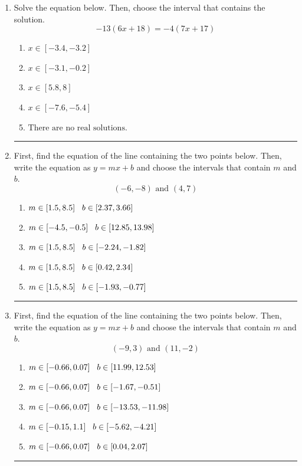 \documentclass[14pt]{extbook}
\newcommand{\litem}[1]{\item#1\hspace*{-1cm}\rule{\textwidth}{0.4pt}}
\begin{document}
\begin{enumerate}
\litem{
Solve the equation below. Then, choose the interval that contains the solution.\[ -13(6x + 18) = -4(7x + 17) \]\begin{enumerate}[label=\Alph*.]
\item \( x \in [-3.4, -3.2] \)
\item \( x \in [-3.1, -0.2] \)
\item \( x \in [5.8, 8] \)
\item \( x \in [-7.6, -5.4] \)
\item \( \text{There are no real solutions.} \)

\end{enumerate} }
\litem{
First, find the equation of the line containing the two points below. Then, write the equation as $ y=mx+b $ and choose the intervals that contain $m$ and $b$.\[ (-6, -8) \text{ and } (4, 7) \]\begin{enumerate}[label=\Alph*.]
\item \( m \in [1.5, 8.5] \hspace*{3mm} b \in [2.37, 3.66] \)
\item \( m \in [-4.5, -0.5] \hspace*{3mm} b \in [12.85, 13.98] \)
\item \( m \in [1.5, 8.5] \hspace*{3mm} b \in [-2.24, -1.82] \)
\item \( m \in [1.5, 8.5] \hspace*{3mm} b \in [0.42, 2.34] \)
\item \( m \in [1.5, 8.5] \hspace*{3mm} b \in [-1.93, -0.77] \)

\end{enumerate} }
\litem{
First, find the equation of the line containing the two points below. Then, write the equation as $ y=mx+b $ and choose the intervals that contain $m$ and $b$.\[ (-9, 3) \text{ and } (11, -2) \]\begin{enumerate}[label=\Alph*.]
\item \( m \in [-0.66, 0.07] \hspace*{3mm} b \in [11.99, 12.53] \)
\item \( m \in [-0.66, 0.07] \hspace*{3mm} b \in [-1.67, -0.51] \)
\item \( m \in [-0.66, 0.07] \hspace*{3mm} b \in [-13.53, -11.98] \)
\item \( m \in [-0.15, 1.1] \hspace*{3mm} b \in [-5.62, -4.21] \)
\item \( m \in [-0.66, 0.07] \hspace*{3mm} b \in [0.04, 2.07] \)


\end{enumerate}}
\end{enumerate}
\end{document}
